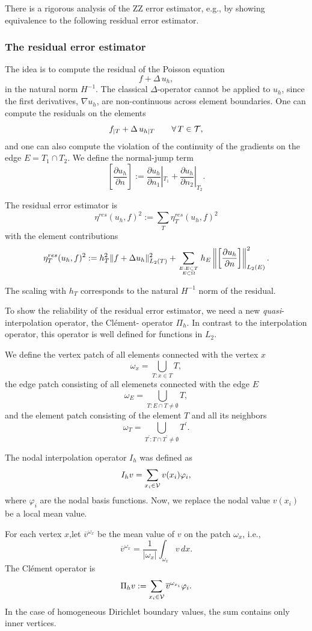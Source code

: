 There is a rigorous analysis of the ZZ error estimator, e.g., by showing equivalence
to the following residual error estimator.

\subsubsection{The residual error estimator}
The idea is to compute the residual of the Poisson equation
$$
f + \Delta \, u_h,
$$
in the natural norm $H^{-1}$. The classical $\Delta$-operator cannot be 
applied  to $u_h$, since the first derivatives, $\nabla u_h$, are non-continuous across element 
boundaries. One can compute the residuals on the elements
$$
f_{|T} + \Delta \, u_{h|T} \qquad \forall \, T \in {\cal T},
$$
and one can also compute the violation of the continuity of the gradients on the
edge $E = T_1 \cap T_2$.  We define the normal-jump term
$$
\left[\frac{\partial u_h}{\partial n} \right] := 
\frac{\partial u_h}{\partial n_1}|_{T_1} + 
\frac{\partial u_h}{\partial n_2}|_{T_2}.
$$

The residual error estimator is
$$
\eta^{res}(u_h,f)^2 := \sum_T \eta_T^{res}(u_h,f)^2
$$
with the element contributions
$$
\eta_T^{res}(u_h, f)^2 := h_T^2 \| f + \Delta u_h \|_{L_2(T)}^2 +
 \sum_{E : E \subset T \atop E \subset \Omega} h_E \left\| \left[ \frac{\partial u_h}{\partial n} \right] \right\|_{L_2(E)} ^2.
$$

The scaling with $h_T$ corresponds to the natural $H^{-1}$ norm of the residual.

\bigskip

To show the reliability of the residual error estimator, we need a new
{\em quasi}-interpolation operator, the Cl\'{e}ment- operator $\Pi_h$. In
contrast to the interpolation operator, this operator is well defined
for functions in $L_2$.

We define the vertex patch of all elements connected with the vertex $x$
$$
\omega_x = \bigcup_{T : x \in T} T,
$$
the edge patch consisting of all elemenets connected with the edge $E$
$$
\omega_E = \bigcup_{T : E \cap T \neq \emptyset} T,
$$
and the element patch consisting of the element $T$ and all its neighbors
$$
\omega_T = \bigcup_{T^\prime : T \cap T^\prime \neq \emptyset} T^\prime.
$$

The nodal interpolation operator $I_h$ was defined as
$$
I_h v = \sum_{x_i \in {\cal V}} v(x_i) \varphi_i,
$$
where $\varphi_i$ are the nodal basis functions.
Now, we replace the nodal value $v(x_i)$ be a local mean value.

\begin{definition} For each vertex $x$,let $\overline{v}^{\omega_x}$ be the mean value of $v$ on the patch $\omega_x$, i.e.,
$$
\overline{v}^{\omega_x} = \frac{1}{|\omega_x|} \int_{\omega_x} v \, dx.
$$
The Cl\'ement operator is 
$$
\Pi_h v := \sum_{x_i \in {\cal V}} \overline{v}^{\omega_{x_i}} \varphi_i.
$$
In the case of homogeneous Dirichlet boundary values, the sum contains only
inner vertices.
\end{definition}


